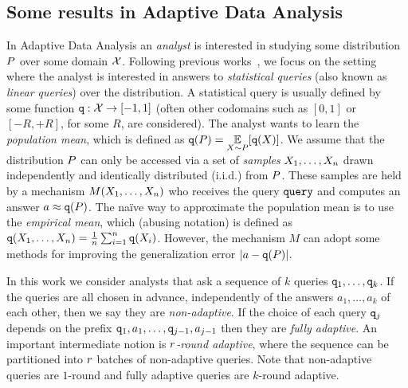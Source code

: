 \subsection{Some results in Adaptive Data Analysis}
In Adaptive Data Analysis an \emph{analyst} is interested in studying some distribution $P$ over some domain $\mathcal{X}$.  Following previous works~\cite{DworkFHPRR15,HardtU14,BassilyNSSSU16}, we focus on the setting where the analyst is interested in answers to \emph{statistical queries} (also known as \emph{linear queries}) over the distribution.  A statistical query is usually defined by some function ${\tt q} : \mathcal{X} \to [-1,1]$ (often other codomains such as $[0,1]$ or $[-R,+R]$, for some $R$, are considered).  The analyst wants to learn the \emph{population mean}, which is defined as 
$\qquery(\dist) = \ex{\sample \sim \dist}{\qquery(\sample)}$. 
%
We assume that the distribution $P$ can only be accessed via a set of \emph{samples} $X_1,\dots,X_n$ drawn independently and identically distributed (i.i.d.) from $P$.  These samples are held by a mechanism $M(X_1,\dots,X_n)$ who receives the query ${\tt query}$ and computes an answer 
$a \approx {\tt q}(P)$.
%
The na\"ive way to approximate the population mean is to use the \emph{empirical mean}, which (abusing notation) is defined as 
${\tt q}(X_1,\dots,X_n) = \frac{1}{n} \sum_{i=1}^{n} {\tt q}(X_i)$.
However, the mechanism $M$ can adopt some methods for improving the generalization error $| a- {\tt q}(P)|$.

In this work we consider analysts that ask a sequence of $k$ queries ${\tt q}_1,\dots,{\tt q}_k$.  If the queries are all chosen in advance, independently of the answers $a_1,\dots,a_k$ of each other, then we say they are \emph{non-adaptive}.  If the choice of each query ${\tt q}_j$ depends on the prefix ${\tt q}_1,a_1,\dots,{\tt q}_{j-1},a_{j-1}$ then they are \emph{fully adaptive}.  An important intermediate notion is \emph{$r$-round adaptive}, where the sequence can be partitioned into $r$ batches of non-adaptive queries.  Note that non-adaptive queries are $1$-round and fully adaptive queries are $k$-round adaptive.

